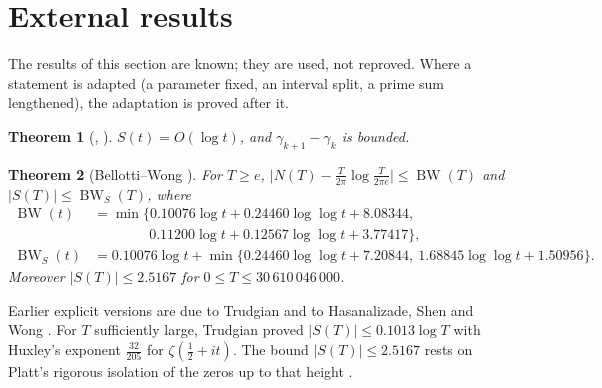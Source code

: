 \documentclass[preprint,12pt]{elsarticle}
\numberwithin{equation}{section}
\theoremstyle{plain}
\newtheorem{theorem}{Theorem}[section]
\theoremstyle{definition}
\theoremstyle{remark}
\newcommand{\BW}{\operatorname{BW}}
\newcommand{\BWS}{\operatorname{BW}_S}
\begin{document}

\section{External results}
\label{sec:known_results}

The results of this section are known; they are used, not reproved. Where a statement is adapted (a parameter fixed, an interval split, a prime sum lengthened), the adaptation is proved after it.


\begin{theorem}[{\cite[Thms.~9.4, 9.9 and \S9.12]{Titchmarsh1986}}, {\cite{Littlewood1924}}]\label{thm:known_basic}
$S(t)=O(\log t)$, and $\gamma_{k+1}-\gamma_k$ is bounded.
\end{theorem}

\begin{theorem}[Bellotti--Wong {\cite[Thm.~1.1, Cor.~1.5 and (1.2)]{BellottiWong2025}}]\label{thm:known_BW}
For $T\ge e$, $\bigl|N(T)-\frac T{2\pi}\log\frac T{2\pi e}\bigr|\le\BW(T)$ and $|S(T)|\le\BWS(T)$, where
\begin{equation}
\begin{split}
\BW(t)&=\min\{0.10076\log t+0.24460\log\log t+8.08344,\\
&\qquad\qquad0.11200\log t+0.12567\log\log t+3.77417\},\\
\BWS(t)&=0.10076\log t+\min\{0.24460\log\log t+7.20844,\ 1.68845\log\log t+1.50956\}.
\end{split}
\label{eq:BWS_def}
\end{equation}
Moreover $|S(T)|\le2.5167$ for $0\le T\le30\,610\,046\,000$.
\end{theorem}
Earlier explicit versions are due to Trudgian \cite{Trudgian2014} and to Hasanalizade, Shen and Wong \cite{HasanalizadeShenWong2022}. For $T$ sufficiently large, Trudgian \cite[\S5 of the preprint]{Trudgian2010} proved $|S(T)|\le0.1013\log T$ with Huxley\textquoteright s exponent $\frac{32}{205}$ for $\zeta(\frac12+it)$. The bound $|S(T)|\le2.5167$ rests on Platt's rigorous isolation of the zeros up to that height \cite[(1.2)]{BellottiWong2025}.
\end{document}
